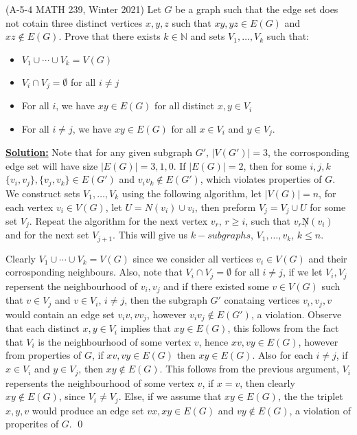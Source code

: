 \documentclass[11pt]{book}
\theoremstyle{definition}
\newcommand{\N}{\ensuremath{\mathbb{N}}}
\begin{document}
(A-5-4 MATH 239, Winter 2021) Let $G$ be a graph such that the edge set does not cotain three distinct vertices $x,y,z$ such that $xy, yz \in E(G)$ and $xz\not\in E(G)$. Prove that there exists $k\in \N$ and sets $V_1,\dots,V_k$ such that:
\begin{itemize}
\item $V_1\cup \cdots \cup V_k = V(G)$
\item $V_i \cap V_j = \emptyset$ for all $i \neq j$
\item For all $i$, we have $xy\in E(G)$ for all distinct $x,y\in V_i$
\item For all $i\neq j$, we have $xy\in E(G)$ for all $x\in V_i$ and $y\in V_j$.
\end{itemize}

\textbf{\underline{Solution:}} Note that for any given subgraph $G'$, $|V(G')| = 3$, the corrosponding edge set will have size $|E(G)| = 3,1,0$. If $|E(G)| = 2$, then for some $i,j,k$ $\{v_i,v_j\}, \{v_j,v_k\} \in E(G')$ and $v_iv_k\not\in E(G')$, which violates properties of $G$. We construct sets $V_1,\dots,V_k$ using the following algorithm, let $|V(G)| = n$, for each vertex $v_i\in V(G)$, let $U = N(v_i) \cup v_i$, then preform $V_j = V_j \cup U$ for some set $V_j$. Repeat the algorithm for the next vertex $v_r$, $r\geq i$, such that $v_r\not N(v_i)$ and for the next set $V_{j + 1}$. This will give us $k-subgraphs$, $V_1,\dots,v_k$, $k\leq n$.

Clearly $V_1\cup \cdots \cup V_k = V(G)$ since we consider all vertices $v_i \in V(G)$ and their corrosponding neighbours. Also, note that $V_i\cap V_j = \emptyset$ for all $i\neq j$, if we let $V_i,V_j$ repersent the neighbourhood of $v_i,v_j$ and if there existed some $v\in V(G)$ such that $v\in V_j$ and $v\in V_i$, $i\neq j$, then the subgraph $G'$ conataing vertices $v_i,v_j,v$ would contain an edge set $v_iv, vv_j$, however $v_iv_j\not\in E(G')$, a violation. Observe that each distinct $x,y\in V_i$ implies that $xy\in E(G)$, this follows from the fact that $V_i$ is the neighbourhood of some vertex $v$, hence $xv, vy\in E(G)$, however from properties of $G$, if $xv,vy\in E(G)$ then $xy\in E(G)$. Also for each $i\neq j$, if $x\in V_i$ and $y\in V_j$, then $xy\not\in E(G)$. This follows from the previous argument, $V_i$ repersents the neighbourhood of some vertex $v$, if $x = v$, then clearly $xy\not\in E(G)$, since $V_i\neq V_j$. Else, if we assume that $xy \in E(G)$, the the triplet $x,y,v$ would produce an edge set $vx, xy\in E(G)$ and $vy\not\in E(G)$, a violation of properites of $G$. \qed
\end{document}
